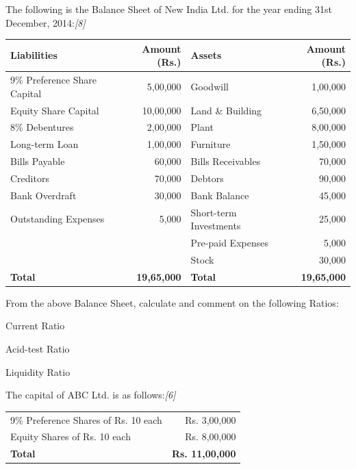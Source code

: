 \documentclass[11pt,a4paper]{article}
\newcommand{\pts}[1]{\hfill   \textit{[#1]}}
\begin{document}
\begin{parts}
  \item The following is the Balance Sheet of New India Ltd. for the year ending 31st December, 2014:\pts{8}
  
  
\begin{center}
  \small
  \renewcommand{\arraystretch}{1.2}
  
\begin{tabular}{|l|r|l|r|}
  \hline
   \textbf{Liabilities} &   \textbf{Amount (Rs.)} &   \textbf{Assets} &   \textbf{Amount (Rs.)} \\ \hline
  9\% Preference Share Capital & 5,00,000 & Goodwill & 1,00,000 \\
  Equity Share Capital & 10,00,000 & Land \& Building & 6,50,000 \\
  8\% Debentures & 2,00,000 & Plant & 8,00,000 \\
  Long-term Loan & 1,00,000 & Furniture & 1,50,000 \\
  Bills Payable & 60,000 & Bills Receivables & 70,000 \\
  Creditors & 70,000 & Debtors & 90,000 \\
  Bank Overdraft & 30,000 & Bank Balance & 45,000 \\
  Outstanding Expenses & 5,000 & Short-term Investments & 25,000 \\
  & & Pre-paid Expenses & 5,000 \\
  & & Stock & 30,000 \\ \hline
   \textbf{Total} &   \textbf{19,65,000} &   \textbf{Total} &   \textbf{19,65,000} \\ \hline
  \end{tabular}
  \end{center}

  From the above Balance Sheet, calculate and comment on the following Ratios:
  
\begin{parts}
    \item Current Ratio
    \item Acid-test Ratio
    \item Liquidity Ratio
  \end{parts}
  
  \item The capital of ABC Ltd. is as follows:\pts{6}
  
\begin{center}
  \renewcommand{\arraystretch}{1.1}
  
\begin{tabular}{lr}
    9\% Preference Shares of Rs. 10 each & Rs. 3,00,000 \\
    Equity Shares of Rs. 10 each & Rs. 8,00,000 \\ \hline
   \textbf{Total} &   \textbf{Rs. 11,00,000} \\ \hline
  \end{tabular}
  \end{center}
  

\end{parts}
\end{document}
